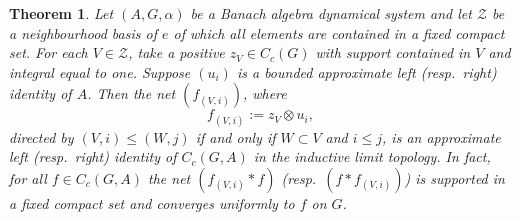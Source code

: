 \documentclass{amsart}
\theoremstyle{plain}
\newtheorem{theorem}{Theorem}[section]
\theoremstyle{definition}
\numberwithin{equation}{section}
\begin{document}
\begin{theorem}\label{t:C_c(G,A)_has_approximate_identities_in_inductive_limit_topology}
 Let ${(A,G,\alpha)}$ be a Banach algebra dynamical system and let $\mathcal{Z}$ be a neighbourhood basis of $e$ of which all elements are contained in a fixed compact set. For each $V \in \mathcal{Z}$, take a positive $z_V \in C_c(G)$ with support contained in $V$ and integral equal to one. Suppose $(u_i)$ is a bounded approximate left \textup{(}resp.\ right\textup{)} identity of $A$. Then the net $\left(f_{(V,i)}\right)$, where
\[ f_{(V,i)} := z_V \otimes u_i, \]
directed by $(V,i) \leq (W,j)$ if and only if $W \subset V$ and $i \leq j$, is an approximate left \textup{(}resp.\ right\textup{)} identity of $C_c(G,A)$ in the inductive limit topology. In fact, for all $f \in C_c(G,A)$ the net $\left(f_{(V,i)} * f\right)$ \textup{(}resp.\ $\left(f * f_{(V,i)}\right)$\textup{)} is supported in a fixed compact set and converges uniformly to $f$ on $G$.
\end{theorem}
\end{document}
